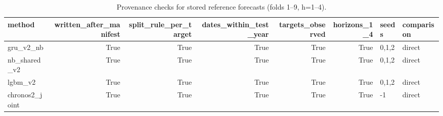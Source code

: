 \begin{table}[t]
\centering
\small
\caption{Provenance checks for stored reference forecasts (folds 1--9, h=1--4).}
\label{tab:reference-provenance}
\begin{tabular}{lrrrrrll}
\toprule
method & written\_after\_manifest & split\_rule\_per\_target & dates\_within\_test\_year & targets\_observed & horizons\_1\_4 & seeds & comparison \\
\midrule
gru\_v2\_nb & True & True & True & True & True & 0,1,2 & direct \\
nb\_shared\_v2 & True & True & True & True & True & 0,1,2 & direct \\
lgbm\_v2 & True & True & True & True & True & 0,1,2 & direct \\
chronos2\_joint & True & True & True & True & True & -1 & direct \\
\bottomrule
\end{tabular}
\end{table}
